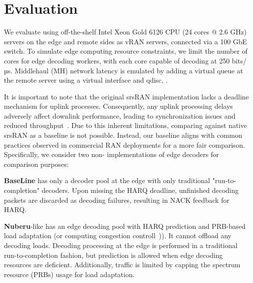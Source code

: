 \section{Evaluation}
We evaluate \Name{} using off-the-shelf Intel Xeon Gold 6126 CPU (24 cores @ 2.6 GHz) servers on the edge and remote sides as vRAN servers, connected via a 100 GbE switch. To simulate edge computing resource constraints, we limit the number of cores for edge decoding workers, with each core capable of decoding at 250 bits/µs. Middlehaul (MH) network latency is emulated by adding a virtual queue at the remote server using a virtual interface and qdisc, .



It is important to note that the original srsRAN implementation lacks a deadline mechanism for uplink processes. Consequently, any uplink processing delays adversely affect downlink performance, leading to synchronization issues and reduced throughput~\cite{Nuberu}. Due to this inherent limitations, comparing against native srsRAN as a baseline is not possible. Instead, our baseline aligns with common practices observed in commercial RAN deployments for a more fair comparison. Specifically, we consider two non-\Name{} implementations of edge decoders for comparison purposes:

\textbf{BaseLine} has only a decoder pool at the edge with only traditional "run-to-completion" decoders. 
Upon missing the HARQ deadline, unfinished decoding packets are discarded as decoding failures, resulting in NACK feedback for HARQ.

\textbf{Nuberu}-like 
has an edge decoding pool with HARQ prediction and PRB-based load adaptation (or computing congestion controll~\cite{Nuberu})). It cannot offload any decoding loads. Decoding processing at the edge is performed in a traditional run-to-completion fashion, but prediction is allowed when edge decoding resources are deficient. Additionally, traffic is limited by capping the spectrum resource (PRBs) usage for load adaptation.

